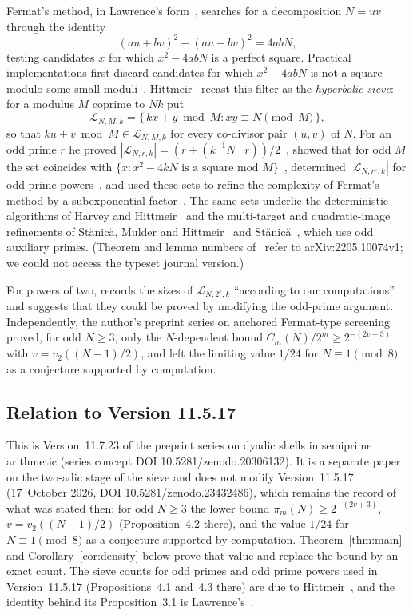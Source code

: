 \documentclass[11pt]{amsart}
\theoremstyle{remark}
\newcommand{\Lset}{\mathcal{L}}
\begin{document}
Fermat's method, in Lawrence's form~\cite{lawrence}, searches for a decomposition $N=uv$ through the identity
\[
(au+bv)^2-(au-bv)^2=4abN ,
\]
testing candidates $x$ for which $x^2-4abN$ is a perfect square. Practical implementations first discard candidates for which $x^2-4abN$ is not a square modulo some small moduli~\cite{mckee}. Hittmeir~\cite{hittmeir2018,hittmeir2023} recast this filter as the \emph{hyperbolic sieve}: for a modulus $M$ coprime to $Nk$ put
\[
\Lset_{N,M,k}=\{\,kx+y \bmod M : xy\equiv N \pmod M\,\},
\]
so that $ku+v \bmod M\in\Lset_{N,M,k}$ for every co-divisor pair $(u,v)$ of $N$. For an odd prime $r$ he proved $|\Lset_{N,r,k}|=(r+(k^{-1}N\mid r))/2$~\cite[Lemma~3.4]{hittmeir2023}, showed that for odd $M$ the set coincides with $\{x : x^2-4kN \text{ is a square mod } M\}$~\cite[Lemma~4.2]{hittmeir2023}, determined $|\Lset_{N,r^e,k}|$ for odd prime powers~\cite[Theorem~3.5]{hittmeir2023}, and used these sets to refine the complexity of Fermat's method by a subexponential factor~\cite[Theorem~4.6]{hittmeir2023}. The same sets underlie the deterministic algorithms of Harvey and Hittmeir~\cite{harveyhittmeir} and the multi-target and quadratic-image refinements of Stănică, Mulder and Hittmeir~\cite{smh2026} and Stănică~\cite{stanica2026}, which use odd auxiliary primes. (Theorem and lemma numbers of~\cite{hittmeir2023} refer to arXiv:2205.10074v1; we could not access the typeset journal version.)

For powers of two, \cite[Remark~7.5]{hittmeir2023} records the sizes of $\Lset_{N,2^e,k}$ ``according to our computations'' and suggests that they could be proved by modifying the odd-prime argument. Independently, the author's preprint series on anchored Fermat-type screening~\cite{khach11517} proved, for odd $N\ge3$, only the $N$-dependent bound $C_m(N)/2^m\ge2^{-(2v+3)}$ with $v=v_2((N-1)/2)$, and left the limiting value $1/24$ for $N\equiv1\pmod8$ as a conjecture supported by computation.

\subsection*{Relation to Version 11.5.17}
This is Version~11.7.23 of the preprint series on dyadic shells in semiprime arithmetic (series concept DOI 10.5281/zenodo.20306132). It is a separate paper on the two-adic stage of the sieve and does not modify Version~11.5.17~\cite{khach11517} (17~October 2026, DOI 10.5281/zenodo.23432486), which remains the record of what was stated then: for odd $N\ge3$ the lower bound $\pi_m(N)\ge2^{-(2v+3)}$, $v=v_2((N-1)/2)$ (Proposition~4.2 there), and the value $1/24$ for $N\equiv1\pmod 8$ as a conjecture supported by computation. Theorem~\ref{thm:main} and Corollary~\ref{cor:density} below prove that value and replace the bound by an exact count. The sieve counts for odd primes and odd prime powers used in Version~11.5.17 (Propositions~4.1 and~4.3 there) are due to Hittmeir~\cite{hittmeir2023}, and the identity behind its Proposition~3.1 is Lawrence's~\cite{lawrence}.
\end{document}
